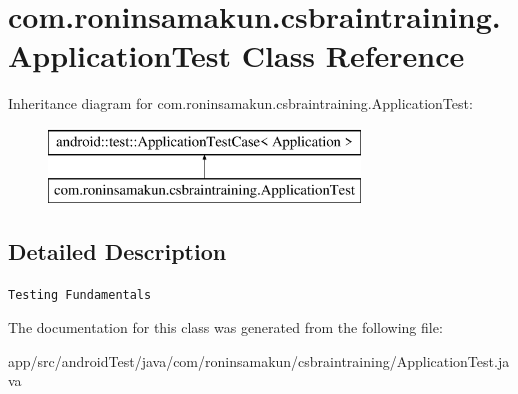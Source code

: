 \section{com.\+roninsamakun.\+csbraintraining.\+Application\+Test Class Reference}
\label{classcom_1_1roninsamakun_1_1csbraintraining_1_1_application_test}
Inheritance diagram for com.\+roninsamakun.\+csbraintraining.\+Application\+Test\+:\begin{figure}[H]
\begin{center}
\leavevmode
\includegraphics[height=2.000000cm]{classcom_1_1roninsamakun_1_1csbraintraining_1_1_application_test}
\end{center}
\end{figure}


\subsection{Detailed Description}
{\tt Testing Fundamentals} 

The documentation for this class was generated from the following file\+:\begin{DoxyCompactItemize}
\item 
app/src/android\+Test/java/com/roninsamakun/csbraintraining/Application\+Test.\+java\end{DoxyCompactItemize}
